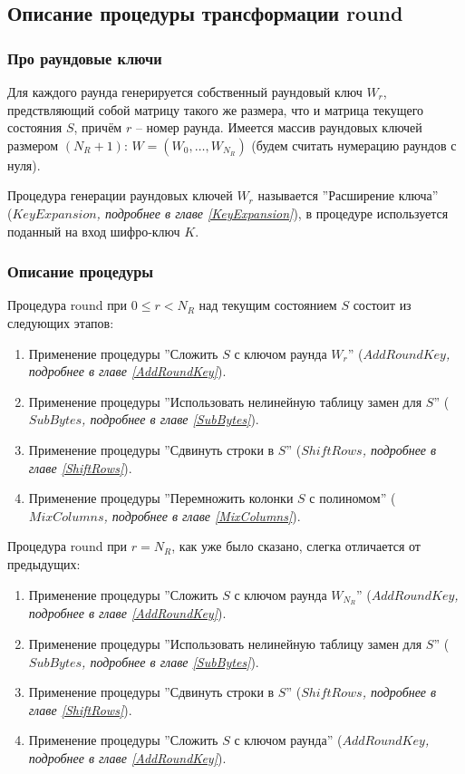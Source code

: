 \subsection{Описание процедуры трансформации round} \label{Round}

\subsubsection{Про раундовые ключи}
    Для каждого раунда генерируется собственный раундовый ключ $W_{r}$, предствляющий собой матрицу такого же размера,
    что и матрица текущего состояния $S$, причём $r$ -- номер раунда.
    Имеется массив раундовых ключей размером $(N_R + 1)$: $W = (W_{0}, \dots, W_{N_R})$
    (будем считать нумерацию раундов с нуля).

    Процедура генерации раундовых ключей $W_{r}$ называется ''Расширение ключа'' \\
    (\textit{$KeyExpansion$, подробнее в главе \ref{KeyExpansion}}), в процедуре используется поданный на вход
    шифро-ключ $K$.

    \subsubsection{Описание процедуры} \label{RoundDescription}
    Процедура round при $0 \leq r < N_R$ над текущим состоянием $S$ состоит из следующих этапов:
    \begin{enumerate}
        \item Применение процедуры ''Сложить $S$ с ключом раунда $W_{r}$'' (\textit{$AddRoundKey$, подробнее в главе \ref{AddRoundKey}}).
        \item Применение процедуры ''Использовать нелинейную таблицу замен для $S$'' (\textit{$SubBytes$, подробнее в главе \ref{SubBytes}}).
        \item Применение процедуры ''Сдвинуть строки в $S$'' (\textit{$ShiftRows$, подробнее в главе \ref{ShiftRows}}).
        \item Применение процедуры ''Перемножить колонки $S$ с полиномом'' (\textit{$MixColumns$, подробнее в главе \ref{MixColumns}}).
    \end{enumerate}

    Процедура round при $r = N_R$, как уже было сказано, слегка отличается от предыдущих:
    \begin{enumerate}
        \item Применение процедуры ''Сложить $S$ с ключом раунда $W_{N_R}$'' (\textit{$AddRoundKey$, подробнее в главе \ref{AddRoundKey}}).
        \item Применение процедуры ''Использовать нелинейную таблицу замен для $S$'' (\textit{$SubBytes$, подробнее в главе \ref{SubBytes}}).
        \item Применение процедуры ''Сдвинуть строки в $S$'' (\textit{$ShiftRows$, подробнее в главе \ref{ShiftRows}}).
        \item Применение процедуры ''Сложить $S$ с ключом раунда'' (\textit{$AddRoundKey$, подробнее в главе \ref{AddRoundKey}}).
    \end{enumerate}

